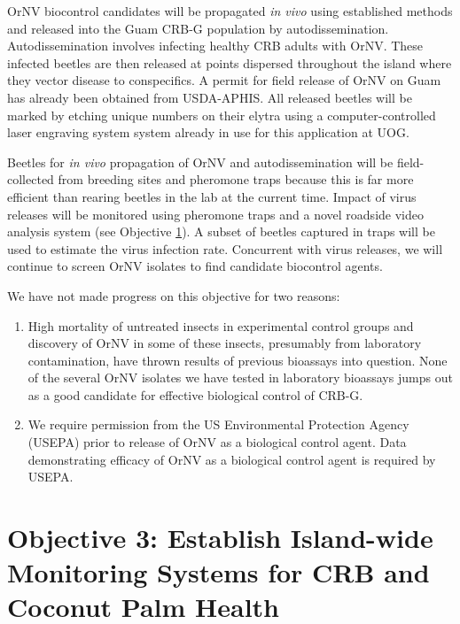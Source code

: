 \documentclass[12pt,letterpaper,english,bibliography=totocnumbered, abstract=on]{scrartcl}
\begin{document}
\begin{framed}
OrNV biocontrol candidates will be propagated \textit{in vivo} using established methods \cite{huger_oryctes_2005-1} and released into the Guam CRB-G population by autodissemination. Autodissemination involves infecting healthy CRB adults with OrNV. These infected beetles are then released at points dispersed throughout the island where they vector disease to conspecifics. A permit for field release of OrNV on Guam has already been obtained from USDA-APHIS. All released beetles will be marked by etching unique numbers on their elytra using a computer-controlled laser engraving system system already in use for this application at UOG.

Beetles for \textit{in vivo} propagation of OrNV and autodissemination will be field-collected from breeding sites and pheromone traps because this is far more efficient than rearing beetles in the lab at the current time. Impact of virus releases will be monitored using pheromone traps and a novel roadside video analysis system (see Objective \ref{monitoring}). A subset of beetles captured in traps will be used to estimate the virus infection rate. Concurrent with virus releases, we will continue to screen OrNV isolates to find candidate biocontrol agents.
\end{framed}

We have not made progress on this objective for two reasons:
\begin{enumerate}
	\item High mortality of untreated insects in experimental control groups and discovery of OrNV in some of these insects, presumably from laboratory contamination, have thrown results of previous bioassays into question.  None of the several OrNV isolates we have tested in laboratory bioassays jumps out as a good candidate for effective biological control of CRB-G.
	\item We require permission from the US Environmental Protection Agency (USEPA) prior to release of OrNV as a biological control agent. Data demonstrating efficacy of OrNV as a biological control agent is required by USEPA.  
\end{enumerate}

\clearpage
\section{Objective 3:  Establish Island-wide Monitoring Systems for CRB and Coconut Palm Health}
\label{monitoring}
\end{document}
